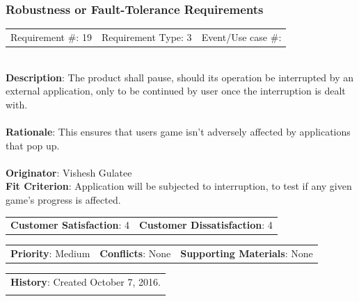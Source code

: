 \documentclass[12pt, titlepage]{article}
\begin{document}
\subsubsection{Robustness or Fault-Tolerance Requirements}

\begin{reqbox}

\begin{tabular}{lll}
Requirement \#: 19 & Requirement Type: 3 & Event/Use case \#: \\
\end{tabular} \\

\textbf{Description}: The product shall pause, should its operation be interrupted by an external application, only to be 
continued by user once the interruption is dealt with. \\ \\
\textbf{Rationale}: This ensures that users game isn't adversely affected by applications that pop up. \\ \\
\textbf{Originator}: Vishesh Gulatee \\
\textbf{Fit Criterion}: Application will be subjected to interruption, to test if any given game's progress is affected. \\

\begin{tabular}{ll}
\textbf{Customer Satisfaction}: 4 & \textbf{Customer Dissatisfaction}: 4 \\
\end{tabular}

\begin{tabular}{lll}
\textbf{Priority}: Medium & \textbf{Conflicts}: None & \textbf{Supporting Materials}: None \\
\end{tabular}

\begin{tabular}{l}
\textbf{History}: Created October 7, 2016.\\ \\
\end{tabular} \\

\end{reqbox}

\end{document}
